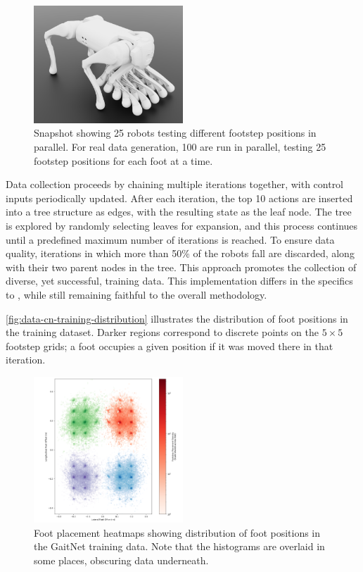 \begin{figure}[H]
  \centering
  \includegraphics[width=0.5\textwidth]{images/figures/training-fl-sweep.png}
  \caption{Snapshot showing 25 robots testing different footstep
    positions in parallel. For real data generation, 100 are run in
  parallel, testing 25 footstep positions for each foot at a time.}
  \label{fig:figure-training-fl-sweep}
\end{figure}

Data collection proceeds by chaining multiple iterations together,
with control inputs periodically updated. After each iteration, the
top 10 actions are inserted into a tree structure as edges, with the
resulting state as the leaf node. The tree is explored by randomly
selecting leaves for expansion, and this process continues until a
predefined maximum number of iterations is reached. To ensure data
quality, iterations in which more than 50\% of the robots fall are
discarded, along with their two parent nodes in the tree. This
approach promotes the collection of diverse, yet successful, training
data. This implementation differs in the specifics to
\cite{bratta_contactnet_2024}, while still remaining faithful
to the overall methodology.

\autoref{fig:data-cn-training-distribution} illustrates the
distribution of foot positions in the training dataset. Darker
regions correspond to discrete points on the $5 \times 5$ footstep
grids; a foot occupies a given position if it was moved there in that iteration.

\begin{figure}[H]
  \centering
  \includegraphics[width=0.5\textwidth]{images/data/foot-placement-heatmaps.png}
  \caption{Foot placement heatmaps showing distribution of foot
    positions in the GaitNet training data. Note that the histograms
  are overlaid in some places, obscuring data underneath.}
  \label{fig:data-cn-training-distribution}
\end{figure}

